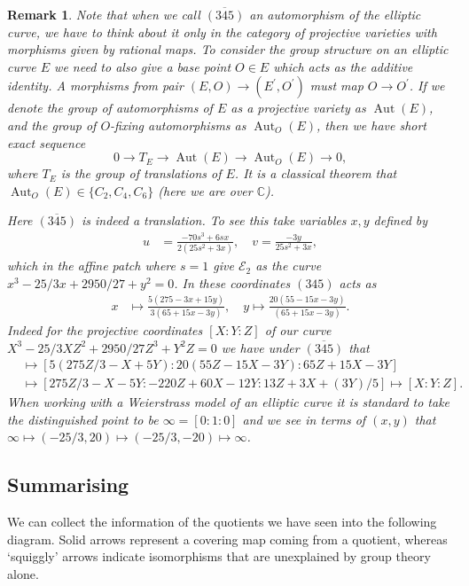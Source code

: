 \documentclass{amsart}
\newtheorem{remark}[theorem]{Remark}
\DeclareMathOperator{\Aut}{Aut}
\begin{document}
\begin{remark}
Note that when we call $\overline{(345)}$ an automorphism of the elliptic curve, we have to think about it only in the category of projective varieties with morphisms given by rational maps. To consider the group structure on an elliptic curve $E$ we need to also give a base point $O \in E$ which acts as the additive identity. A morphisms from pair $(E, O) \to (E^\prime, O^\prime)$ must map $O \to O^\prime$. If we denote the group of automorphisms of $E$ as a projective variety as $\Aut(E)$, and the group of $O$-fixing automorphisms as $\Aut_O(E)$, then we have short exact sequence 
\[
0 \to T_E \to \Aut(E) \to \Aut_O(E) \to 0  ,
\]
where $T_E$ is the group of translations of $E$. It is a classical theorem that $\Aut_O(E)\in\{C_2, C_4, C_6\}$ (here we are over $\mathbb{C}$). 

Here $\overline{(345)}$ is indeed a translation. To see this take variables $x,y$ defined by 
\begin{align*}
    u &= \frac{-70s^3 + 6sx}{2(25s^2+3x)},\quad
    v = \frac{-3y}{25s^2 + 3x} ,
\end{align*}
which in the affine patch where $s=1$ give $\mathcal{E}_2$ as the curve $x^3-25/3 x+2950/27+y^2 = 0$. In these coordinates $(345)$ acts as 
\begin{align*}
    x &\mapsto  \frac{5(275 - 3x + 15y)}{3(65 + 15x - 3y)},\quad
    y \mapsto \frac{20(55 - 15x - 3y)}{(65 + 15x - 3y)} .
\end{align*}
Indeed for the projective coordinates $[X:Y:Z]$ of our curve
$X^3-25/3 X Z^2 +2950/27 Z^3+Y^2 Z = 0$ we have under $\overline{(345)}$ that
\begin{align*}
[X:Y:Z]&\mapsto [{5(275Z/3 - X + 5Y)}:20(55Z - 15X - 3Y):65Z + 15X - 3Y ]\\
&\mapsto [275Z/3 - X - 5Y: -220Z + 60X - 12Y: 13Z + 3X + (3Y)/5  ] \mapsto [X:Y:Z].
\end{align*}
When working with a Weierstrass model of an elliptic curve it is standard to take the distinguished point to be $\infty=[0:1:0]$ and we see in terms of $(x,y)$ that  $\infty\mapsto (-25/3, 20)\mapsto (-25/3, -20)\mapsto \infty$. 
\end{remark}

\subsection{Summarising}\label{subsec: summarising quotients}
We can collect the information of the quotients we have seen into the following diagram. Solid arrows represent a covering map coming from a quotient, whereas `squiggly' arrows indicate isomorphisms that are unexplained by group theory alone. 
\end{document}
